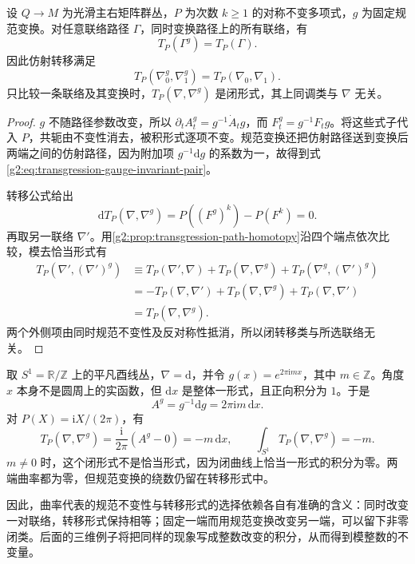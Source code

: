 \begin{proposition}\label{g2:prop:transgression-gauge-naturality}
	设 \(Q\to M\) 为光滑主右矩阵群丛，\(P\) 为次数 \(k\ge1\) 的对称不变多项式，\(g\) 为固定规范变换。对任意联络路径 \(\Gamma\)，同时变换路径上的所有联络，有
	\[
		T_P(\Gamma^g)=T_P(\Gamma).
	\]
	因此仿射转移满足
	\begin{equation}\label{g2:eq:transgression-gauge-invariant-pair}
		T_P(\nabla_0^g,\nabla_1^g)=T_P(\nabla_0,\nabla_1).
	\end{equation}
	只比较一条联络及其变换时，\(T_P(\nabla,\nabla^g)\) 是闭形式，其上同调类与 \(\nabla\) 无关。
\end{proposition}
\begin{proof}
	\(g\) 不随路径参数改变，所以 \(\partial_tA_t^g=g^{-1}\dot A_tg\)，而 \(F_t^g=g^{-1}F_tg\)。将这些式子代入 \(P\)，共轭由不变性消去，被积形式逐项不变。规范变换还把仿射路径送到变换后两端之间的仿射路径，因为附加项 \(g^{-1}\mathrm dg\) 的系数为一，故得到式\eqref{g2:eq:transgression-gauge-invariant-pair}。

	转移公式给出
	\[
		\mathrm dT_P(\nabla,\nabla^g)=P((F^g)^k)-P(F^k)=0.
	\]
	再取另一联络 \(\nabla'\)。用\cref{g2:prop:transgression-path-homotopy}沿四个端点依次比较，模去恰当形式有
	\[
	\begin{aligned}
		T_P(\nabla',(\nabla')^g)
		&\equiv T_P(\nabla',\nabla)+T_P(\nabla,\nabla^g)
		+T_P(\nabla^g,(\nabla')^g)\\
		&=-T_P(\nabla,\nabla')+T_P(\nabla,\nabla^g)
		+T_P(\nabla,\nabla')\\
		&=T_P(\nabla,\nabla^g).
	\end{aligned}
	\]
	两个外侧项由同时规范不变性及反对称性抵消，所以闭转移类与所选联络无关。
\end{proof}

\begin{example}\label{g2:exm:circle-gauge-transgression}
	取 \(S^1=\mathbb R/\mathbb Z\) 上的平凡酉线丛，\(\nabla=\mathrm d\)，并令 \(g(x)=e^{2\pi\mathrm i m x}\)，其中 \(m\in\mathbb Z\)。角度 \(x\) 本身不是圆周上的实函数，但 \(\mathrm dx\) 是整体一形式，且正向积分为 \(1\)。于是
	\[
		A^g=g^{-1}\mathrm dg=2\pi\mathrm i m\,\mathrm dx.
	\]
	对 \(P(X)=\mathrm iX/(2\pi)\)，有
	\[
		T_P(\nabla,\nabla^g)=\frac{\mathrm i}{2\pi}(A^g-0)
		=-m\,\mathrm dx,\qquad
		\int_{S^1}T_P(\nabla,\nabla^g)=-m.
	\]
	\(m\ne0\) 时，这个闭形式不是恰当形式，因为闭曲线上恰当一形式的积分为零。两端曲率都为零，但规范变换的绕数仍留在转移形式中。
\end{example}

因此，曲率代表的规范不变性与转移形式的选择依赖各自有准确的含义：同时改变一对联络，转移形式保持相等；固定一端而用规范变换改变另一端，可以留下非零闭类。后面的三维例子将把同样的现象写成整数改变的积分，从而得到模整数的不变量。
